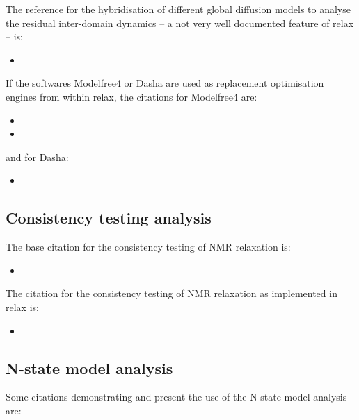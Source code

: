 The reference for the hybridisation of different global diffusion models to analyse the residual inter-domain dynamics -- a not very well documented feature of relax -- is:

\begin{itemize}
\item {}
\end{itemize}

If the softwares Modelfree4 or Dasha are used as replacement optimisation engines from within relax, the citations for Modelfree4 are:

\begin{itemize}
\item {}
\item {}
\end{itemize}

and for Dasha:

\begin{itemize}
\item {}
\end{itemize}



\subsection{Consistency testing analysis}

The base citation for the consistency testing of NMR relaxation is:

\begin{itemize}
\item {}
\end{itemize}

The citation for the consistency testing of NMR relaxation as implemented in relax is:

\begin{itemize}
\item {}
\end{itemize}



\subsection{N-state model analysis}

Some citations demonstrating and present the use of the N-state model analysis are:

